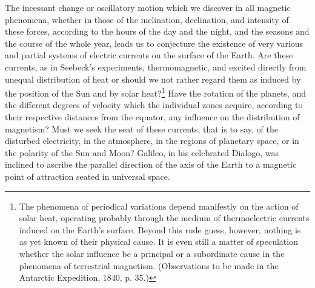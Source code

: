 The incessant change or oscillatory motion which we discover in all magnetic phenomena, whether in those of the inclination, declination, and intensity of these forces, according to the hours of the day and the night, and the seasons and the course of the whole year, leads us to conjecture the existence of very various and partial systems of electric currents on the surface of the Earth. Are these currents, as in Seebeck's experiments, thermomagnetic, and excited directly from unequal distribution of heat or should we not rather regard them as induced by the position of the Sun and by solar heat?\footnote{The phenomena of periodical variations depend manifestly on the action of solar heat, operating probably through the medium of thermoelectric currents induced on the Earth's surface. Beyond this rude guess, however, nothing is as yet known of their physical cause. It is even still a matter of speculation whether the solar influence be a principal or a subordinate cause in the phenomena of terrestrial magnetism. (Observations to be made in the Antarctic Expedition, 1840, p. 35.)} Have the rotation of the planets, and the different degrees of velocity which the individual zones acquire, according to their respective distances from the equator, any influence on the distribution of magnetism? Must we seek the seat of these currents, that is to say, of the disturbed electricity, in the atmosphere, in the regions of planetary space, or in the polarity of the Sun and Moon? Galileo, in his celebrated Dialogo, was inclined to ascribe the parallel direction of the axis of the Earth to a magnetic point of attraction seated in universal space.


